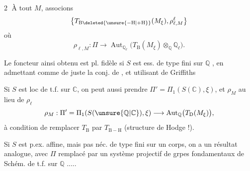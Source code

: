 \textcircled{2}   À tout $M$, associons
\[
\bigl\{T_{\mathrm B\deleted{\unsure{-\mathrm H|+\mathrm H}}}(M_\xi),\rho_{\ell,M}^{\ell}\bigr\}
\]
  où
\[
\rho_{\ell,M}:\Pi\longrightarrow\operatorname{Aut}_{\mathbb Q_\ell}\bigl(T_{\mathrm B}(M_\xi)\otimes_{\mathbb Q}\mathbb Q_\ell\bigr).
\]

Le foncteur ainsi obtenu est pl. fidèle si $S$ est ess. de type fini sur $\mathbb Q$ , en admettant comme de juste la conj. de , et utilisant  de Griffiths

Si $S$ est loc de t.f. sur $\mathbb C$, on peut aussi prendre $\Pi'=\Pi_1(S(\mathbb C),\xi)$, et $\rho_M$ au lieu de $\rho_\ell$
\[
\rho_M:\Pi'=\Pi_1(S(\unsure{\mathbb Q|\mathbb C}),\xi)\longrightarrow\operatorname{Aut}_{\mathbb Q}\bigl(T_{\mathrm D}(M_\xi)\bigr),
\]
à condition de remplacer $T_{\mathrm B}$ par $T_{\mathrm{B-H}}$ (structure de Hodge !).

Si $S$ est p.ex. affine,  mais pas néc. de type fini sur un corps, on a un résultat analogue, avec $\Pi$ remplacé par un système projectif de grpes fondamentaux de Schém. de t.f. sur $\mathbb Q$ .....

